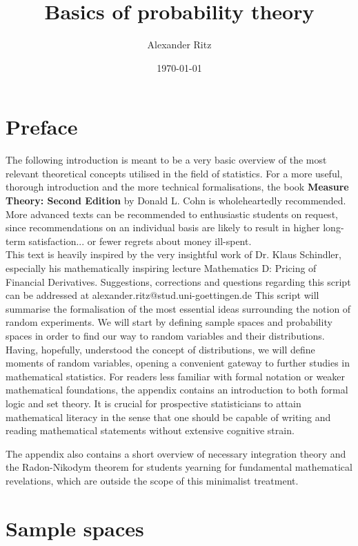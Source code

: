 \documentclass[12pt]{article}
\title{Basics of probability theory}
\author{Alexander Ritz}
\date{\today}
\begin{document}
\maketitle


\section*{Preface}
The following introduction is meant to be a very basic overview of the most relevant theoretical concepts utilised in the field of statistics. For a more useful, thorough introduction and the more technical formalisations, the book \textbf{Measure Theory: Second Edition} by Donald L. Cohn is wholeheartedly recommended. More advanced texts can be recommended to enthusiastic students on request, since recommendations on an individual basis are likely to result in higher long-term satisfaction... or fewer regrets about money ill-spent.\\
This text is heavily inspired by the very insightful work of Dr. Klaus Schindler, especially his mathematically inspiring lecture \glqq Mathematics D: Pricing of Financial Derivatives\grqq .
\newline
Suggestions, corrections and questions regarding this script can be addressed at alexander.ritz@stud.uni-goettingen.de
\newpage
This script will summarise the formalisation of the most essential ideas surrounding the notion of random experiments. We will start by defining sample spaces and probability spaces in order to find our way to random variables and their distributions. Having, hopefully, understood the concept of distributions, we will define moments of random variables, opening a convenient gateway to further studies in mathematical statistics.
\newline
For readers less familiar with formal notation or weaker mathematical foundations, the appendix contains an introduction to both formal logic and set theory. It is crucial for prospective statisticians to attain mathematical literacy in the sense that one should be capable of writing and reading mathematical statements without extensive cognitive strain.

The appendix also contains a short overview of necessary integration theory and the Radon-Nikodym theorem for students yearning for fundamental mathematical revelations, which are outside the scope of this minimalist treatment.
\newpage

\tableofcontents
\newpage
\section{Sample spaces}
\end{document}
